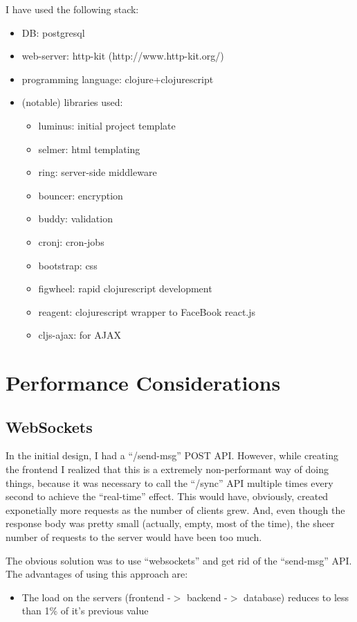 \documentclass[a4paper, 10pt]{article}
\begin{document}
I have used the following stack:
\begin{itemize}
  \item DB: postgresql
  \item web-server: http-kit (http://www.http-kit.org/)
  \item programming language: clojure+clojurescript
  \item (notable) libraries used:
    \begin{itemize}
    \item luminus: initial project template
    \item selmer: html templating
    \item ring: server-side middleware
    \item bouncer: encryption
    \item buddy: validation
    \item cronj: cron-jobs
    \item bootstrap: css
    \item figwheel: rapid clojurescript development
    \item reagent: clojurescript wrapper to FaceBook react.js
    \item cljs-ajax: for AJAX
    \end{itemize}
\end{itemize}

\section{Performance Considerations}
\subsection{WebSockets}
In the initial design, I had a ``/send-msg'' POST API. However, while creating the frontend I realized that this is a extremely non-performant way of doing things, because it was necessary to call the ``/sync'' API multiple times every second to achieve the ``real-time'' effect. This would have, obviously, created exponetially more requests as the number of clients grew. And, even though the response body was pretty small (actually, empty, most of the time), the sheer number of requests to the server would have been too much.

The obvious solution was to use ``websockets'' and get rid of the ``send-msg'' API. The advantages of using this approach are:

\begin{itemize}
  \item The load on the servers (frontend -$>$ backend -$>$ database) reduces to less than 1\% of it's previous value
\end{itemize}
\end{document}
